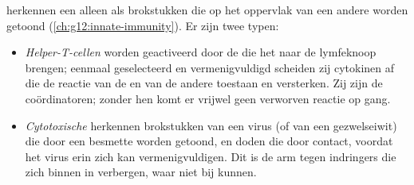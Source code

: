 \begin{proposition}[T-lymfocyten]\label{prop:g12:adaptive-immunity:tcells}
 herkennen een  alleen als brokstukken die op het
oppervlak van een andere  worden getoond (\cref{ch:g12:innate-immunity}).
Er zijn twee typen:
\begin{itemize}
  \item \emph{Helper-T-cellen} worden geactiveerd door
        de  die het  naar de lymfeknoop
        brengen; eenmaal geselecteerd en vermenigvuldigd scheiden zij
        cytokinen af die de reactie van de  en van de andere
         toestaan en versterken. Zij zijn de coördinatoren; zonder
        hen komt er vrijwel geen verworven reactie op gang.
  \item \emph{Cytotoxische } herkennen brokstukken van een virus
        (of van een gezwelseiwit) die door een besmette  worden
        getoond, en doden die  door contact, voordat het virus erin
        zich kan vermenigvuldigen. Dit is de arm tegen indringers die zich
        binnen in  verbergen, waar  niet bij kunnen.
\end{itemize}
\end{proposition}
\admitted

